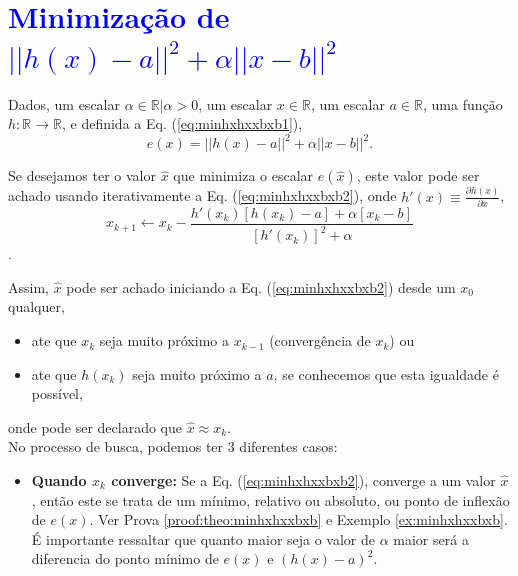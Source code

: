 
~\\
~\\
\section{\textcolor{blue}{Minimização de $||h(x)-a||^2+\alpha ||x-b||^2$}}

\begin{theorem}\label{theo:minhxhxxbxb}
Dados,
um escalar $\alpha \in \mathbb{R} | \alpha > 0$, 
um escalar $x \in \mathbb{R}$, 
um escalar $a \in \mathbb{R}$,  
uma função $h:\mathbb{R} \rightarrow \mathbb{R}$, e 
definida a Eq. (\ref{eq:minhxhxxbxb1}),
\begin{equation}\label{eq:minhxhxxbxb1}
e(x)=||h(x)-a||^2+\alpha ||x-b||^2.
\end{equation}

Se desejamos ter o valor $\hat{x}$ que minimiza o escalar $e(\hat{x})$,
este valor pode ser achado usando iterativamente a Eq. (\ref{eq:minhxhxxbxb2}),
onde  $h'(x)\equiv \frac{\partial h(x)}{\partial x}$,
\begin{equation}\label{eq:minhxhxxbxb2}
x_{k+1} \leftarrow x_k-
\frac{ h'(x_k) \left[h(x_k)-a\right]+\alpha\left[ x_k-b\right]}{\left[h'(x_k)\right]^2+\alpha}
\end{equation}.

Assim, $\hat{x}$ pode ser achado iniciando a Eq. (\ref{eq:minhxhxxbxb2}) desde um 
$x_{0}$ qualquer, 
\begin{itemize}
    \item ate que $x_{k}$ seja muito próximo a $x_{k-1}$ (convergência de $x_{k}$) ou
    \item ate que $h(x_{k})$ seja muito próximo a $a$, 
    se conhecemos que esta igualdade é possível,
\end{itemize}
onde pode ser declarado que $\hat{x} \approx x_{k}$.\\

No processo de busca, podemos ter 3 diferentes casos:
\begin{itemize}
\item \textbf{Quando $x_{k}$ converge:}  
Se a Eq. (\ref{eq:minhxhxxbxb2}),  converge a um valor $\hat{x}$, então este se trata de 
um mínimo, relativo ou absoluto, ou ponto de inflexão de $e(x)$. 
Ver Prova \ref{proof:theo:minhxhxxbxb} e Exemplo \ref{ex:minhxhxxbxb}.
\'E importante ressaltar que quanto maior seja o valor de $\alpha$ maior
será a diferencia do ponto mínimo de $e(x)$ e $(h(x)-a)^2$.



\end{itemize}
\end{theorem}
